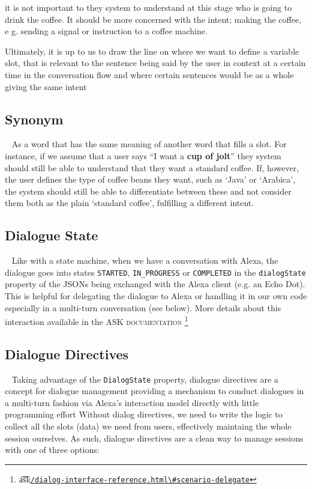 
	it is not important to they system to understand at this stage who is going to drink the coffee. It should be more concerned with the intent; making the coffee, e g. sending a signal or instruction to a coffee machine.
	 
	Ultimately, it is up to us to draw the line on where we want to define a variable slot, that is relevant to the sentence being said by the user in context at a certain time in the conversation flow and where certain sentences would be as a whole giving the same intent
	
	
	\subsection*{Synonym}~\label{synonym:def}
	As a word that has the same meaning of another word that fills a slot. For instance, if we assume that a user says ``I want a \textbf{cup of jolt}'' they system should still be able to understand that they want a standard coffee. If, however, the user defines the type of coffee beans they want, such as `Java' or `Arabica', the system should still be able to differentiate between these and not consider them both as the plain `standard coffee', fulfilling a different intent. 
	
	\subsection*{Dialogue State}~\label{dialogState}
	Like with a state machine, when we have a conversation with Alexa, the dialogue goes into states \texttt{STARTED}, \texttt{IN_PROGRESS} or \texttt{COMPLETED} in the \texttt{dialogState} property of the JSONs being exchanged with the Alexa client (e.g. an Echo Dot). This is helpful for delegating the dialogue to Alexa or handling it in our own code especially in a %
		multi-turn conversation
(see below). More details about this interaction available in the \textsc{ASK documentation} \footnote{\t{a\t{sk}}\href{https://developer.amazon.com/docs/custom-skills/dialog-interface-reference.html\#scenario-delegate}{\lstinline|/dialog-interface-reference.html\#scenario-delegate|}}
	
	

	\subsection*{Dialogue Directives}~\label{directives:def}
	Taking advantage of the \texttt{DialogState} property, dialogue directives are a concept for dialogue management providing a mechanism to conduct dialogues in a multi-turn fashion via Alexa's interaction model directly with little programming effort 
	Without dialog directives, we need to write the logic to collect all the slots (data) we need from users, effectively maintaing the whole session ourselves.
	As such, dialogue directives are a clean way to manage sessions with one of three options: 
	

